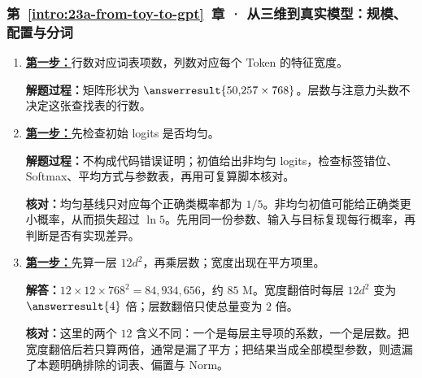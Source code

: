 \subsubsection*{第~\ref*{intro:23a-from-toy-to-gpt}~章 · 从三维到真实模型：规模、配置与分词}
\begin{enumerate}[label={},leftmargin=4.8em,itemsep=4pt]
\item[\textbf{C-087.}] \leavevmode{}\label{solution:C-087}\label{solution:real-embedding-shape}\hyperref[exercise:real-embedding-shape]{\textbf{第一步：}}行数对应词表项数，列数对应每个 Token 的特征宽度。\par\nobreak
\textbf{解题过程：}矩阵形状为 $\answerresult{50{,}257\times768}$。层数与注意力头数不决定这张查找表的行数。
\item[\textbf{C-088.}] \leavevmode{}\label{solution:C-088}\label{solution:uniform-baseline-interpretation}\hyperref[exercise:uniform-baseline-interpretation]{\textbf{第一步：}}先检查初始 logits 是否均匀。\par\nobreak\textbf{解题过程：}不构成代码错误证明；初值给出非均匀 logits，检查标签错位、Softmax、平均方式与参数表，再用可复算脚本核对。\par\textbf{核对：}均匀基线只对应每个正确类概率都为 $1/5$。非均匀初值可能给正确类更小概率，从而损失超过 $\ln5$。先用同一份参数、输入与目标复现每行概率，再判断是否有实现差异。
\item[\textbf{C-089.}] \leavevmode{}\label{solution:C-089}\label{solution:compute-token-budget}\hyperref[exercise:compute-token-budget]{\textbf{第一步：}}先算一层 $12d^2$，再乘层数；宽度出现在平方项里。\par\nobreak
\textbf{解答：}$12\times12\times768^2=84{,}934{,}656$，约 $85$ M。宽度翻倍时每层 $12d^2$ 变为 $\answerresult{4}$ 倍；层数翻倍只使总量变为 $2$ 倍。\par\textbf{核对：}这里的两个 $12$ 含义不同：一个是每层主导项的系数，一个是层数。把宽度翻倍后若只算两倍，通常是漏了平方；把结果当成全部模型参数，则遗漏了本题明确排除的词表、偏置与 Norm。
\end{enumerate}
